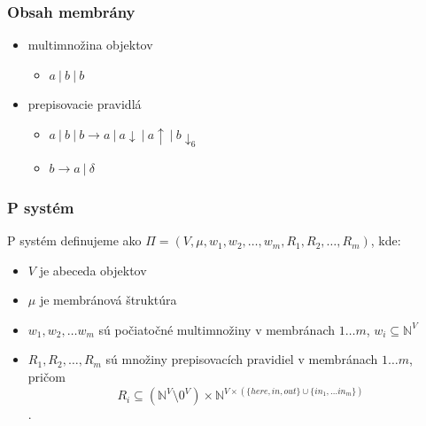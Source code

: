\begin{frame}[t]\frametitle{Obsah membrány}
\begin{itemize}
  \item multimnožina objektov
  \begin{itemize}
    \item $a\ |\ b\ |\ b$
  \end{itemize}
  \item prepisovacie pravidlá
  \begin{itemize}
    \item $a\ |\ b\ |\ b\rightarrow a\ |\ a\downarrow\ |\ a\uparrow\ |\ b\downarrow_6$
    \item $b \rightarrow a\ |\ \delta$
  \end{itemize}
\end{itemize}
\end{frame}

\begin{frame}[t]\frametitle{P systém}

P systém definujeme ako $\Pi = (V, \mu, w_1, w_2,\dots , w_m, R_1, R_2, \dots , R_m)$, kde:
\begin{itemize}
  \item $V$ je abeceda objektov
  \item $\mu$ je membránová štruktúra
  \item $w_1, w_2, \dots w_m$ sú počiatočné multimnožiny v membránach $1\dots m$, $w_i\subseteq \mathbb{N}^V$
  \item $R_1, R_2, \dots , R_m$ sú množiny prepisovacích pravidiel v membránach $1\dots m$, pričom $$R_i\subseteq(\mathbb{N}^V\setminus 0^V)\times\mathbb{N}^{V\times(\{here,in,out\}\cup\{in_1,\dots in_m\})}$$.
\end{itemize}

\end{frame}
\note{}

